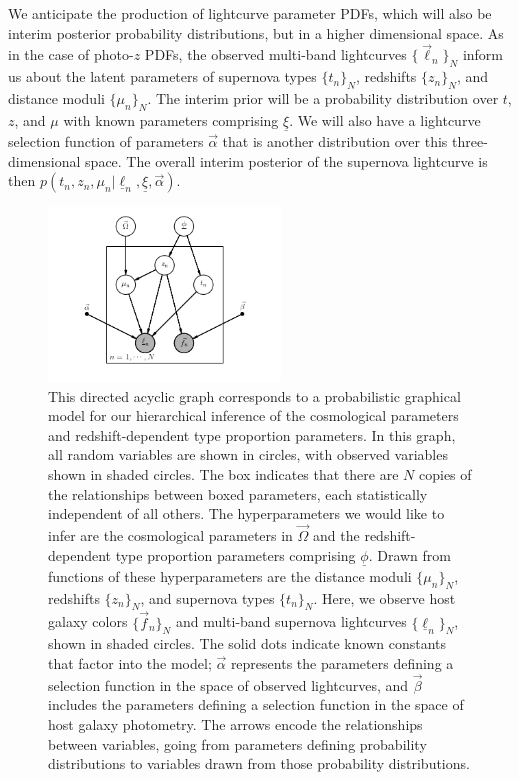 \documentclass[12pt, onecolumn]{emulateapj}
\newcommand{\textul}{\underline}
\begin{document}
We anticipate the production of lightcurve parameter PDFs, which will also be interim posterior probability distributions, but in a higher dimensional space.  As in the case of photo-$z$ PDFs, the observed multi-band lightcurves $\{\vec{\ell}_{n}\}_{N}$ inform us about the latent parameters of supernova types $\{t_{n}\}_{N}$, redshifts $\{z_{n}\}_{N}$, and distance moduli $\{\mu_{n}\}_{N}$.  The interim prior will be a probability distribution over $t$, $z$, and $\mu$ with known parameters comprising $\textul{\xi}$.  We will also have a lightcurve selection function of parameters $\vec{\alpha}$ that is another distribution over this three-dimensional space.  The overall interim posterior of the supernova lightcurve is then $p(t_{n}, z_{n}, \mu_{n} | \textul{\ell}_{n}, \textul{\xi}, \vec{\alpha})$.
\begin{figure}
\begin{center}
\includegraphics[width=0.55\textwidth]{fig/pgm.png}
\caption{This directed acyclic graph corresponds to a probabilistic graphical model for our hierarchical inference of the cosmological parameters and redshift-dependent type proportion parameters.  In this graph, all random variables are shown in circles, with observed variables shown in shaded circles.  The box indicates that there are $N$ copies of the relationships between boxed parameters, each statistically independent of all others.  The hyperparameters we would like to infer are the cosmological parameters in $\vec{\Omega}$ and the redshift-dependent type proportion parameters comprising $\textul{\phi}$.  Drawn from functions of these hyperparameters are the distance moduli $\{\mu_{n}\}_{N}$, redshifts $\{z_{n}\}_{N}$, and supernova types $\{t_{n}\}_{N}$.  Here, we observe host galaxy colors $\{\vec{f}_{n}\}_{N}$ and multi-band supernova lightcurves $\{\textul{\ell}_{n}\}_{N}$, shown in shaded circles.  The solid dots indicate known constants that factor into the model; $\vec{\alpha}$ represents the parameters defining a selection function in the space of observed lightcurves, and $\vec{\beta}$ includes the parameters defining a selection function in the space of host galaxy photometry.  The arrows encode the relationships between variables, going from parameters defining probability distributions to variables drawn from those probability distributions.}
\label{fig:pgm}
\end{center}
\end{figure}
\end{document}
